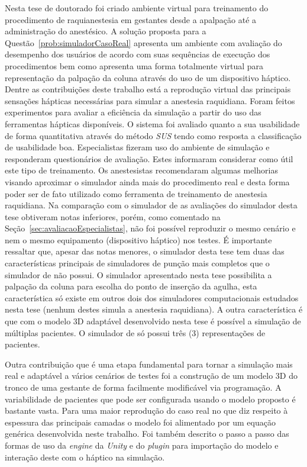 Nesta tese de doutorado foi criado ambiente virtual para treinamento do procedimento de raquianestesia em gestantes desde a apalpação até a administração do anestésico. A solução proposta para a Questão~\ref{prob:simuladorCasoReal} apresenta um ambiente com avaliação do desempenho dos usuários de acordo com suas sequências de execução dos procedimentos bem como apresenta uma forma totalmente virtual para representação da palpação da coluna através do uso de um dispositivo háptico.
Dentre as contribuições deste trabalho está a reprodução virtual das principais sensações hápticas necessárias para simular a anestesia raquidiana. Foram feitos experimentos para avaliar a eficiência da simulação a partir do uso das ferramentas hápticas disponíveis. O sistema foi avaliado quanto a sua usabilidade de forma quantitativa através do método \textit{\acrshort{SUS}} \cite{Brooke2013} tendo como resposta a classificação de usabilidade boa. Especialistas fizeram uso do ambiente de simulação e responderam questionários de avaliação. Estes informaram considerar como útil este tipo de treinamento. Os anestesistas recomendaram algumas melhorias visando aproximar o simulador ainda mais do procedimento real e desta forma poder ser de fato utilizado como ferramenta de treinamento de anestesia raquidiana. Na comparação com o simulador de \textcite{Farber2008} as avaliações do simulador desta tese obtiveram notas inferiores, porém, como comentado na Seção~\ref{sec:avaliacaoEspecialistas}, não foi possível reproduzir o mesmo cenário e nem o mesmo equipamento (dispositivo háptico) nos testes. É importante ressaltar que, apesar das notas menores, o simulador desta tese tem duas das características principais de simuladores de punção mais completos que o simulador de \textcite{Farber2008} não possui. O simulador apresentado nesta tese possibilita a palpação da coluna para escolha do ponto de inserção da agulha, esta característica só existe em outros dois dos simuladores computacionais estudados nesta tese (nenhum destes simula a anestesia raquidiana). A outra característica é que com o modelo 3D adaptável desenvolvido nesta tese é possível a simulação de múltiplas pacientes. O simulador de \textcite{Farber2008} só possui três (3) representações de pacientes.

Outra contribuição que é uma etapa fundamental para tornar a simulação mais real e adaptável a vários cenários de testes foi a construção de um modelo 3D do tronco de uma gestante de forma facilmente modificável via programação. A variabilidade de pacientes que pode ser configurada usando o modelo proposto é bastante vasta. Para uma maior reprodução do caso real no que diz respeito à espessura das principais camadas o modelo foi alimentado por um equação genérica desenvolvida neste trabalho. Foi também descrito o passo a passo das formas de uso da \textit{engine} da \textit{Unity} e do \textit{plugin} para importação do modelo e interação deste com o háptico na simulação. 

